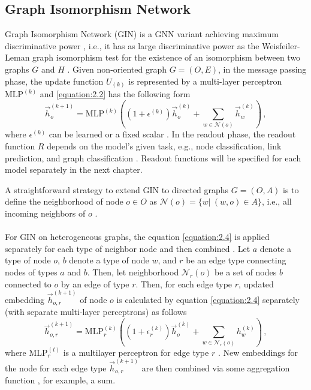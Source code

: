 \subsection{Graph Isomorphism Network} \label{graph Isomorphism network}
Graph Isomorphism Network (GIN) is a GNN variant achieving maximum discriminative power \cite{DBLP:journals/corr/abs-1810-00826}, i.e., it has as large discriminative power as the Weisfeiler-Leman graph isomorphism test for the existence of an isomorphism between two graphs $G$ and $H$ \cite{leman1968reduction}. Given non-oriented graph $G = (O, E)$, in the message passing phase, the update function $U_{(k)}$ is represented by a multi-layer perceptron $\text{MLP}^{(k)}$ and \ref{equation:2.2} has the following form \cite{DBLP:journals/corr/abs-1810-00826}
\begin{equation} \label{equation:2.4}
	\vec{h}_o^{(k+1)} = \text{MLP}^{(k)} \left ( \left ( 1 + \epsilon^{(k)} \right ) \vec{h}_o^{(k)} + \sum_{w\in \mathcal{N}(o)} \vec{h}_w^{(k)} \right ) \, ,
\end{equation}
where $\epsilon^{(k)}$ can be learned or a fixed scalar \cite{DBLP:journals/corr/abs-1810-00826}. In the readout phase, the readout function $R$ depends on the model's given task, e.g., node classification, link prediction, and graph classification \cite{DBLP:journals/corr/abs-1810-00826}. Readout functions will be specified for each model separately in the next chapter.
\par
A straightforward strategy to extend GIN to directed graphs $G = (O, A)$ is to define the neighborhood of node $o \in O$ as $\mathcal{N}(o) = \{ w | \ (w, o) \in A\}$, i.e., all incoming neighbors of $o$ \cite{zhang2020learning}.\\
\\
For GIN on heterogeneous graphs, the equation \ref{equation:2.4} is applied separately for each type of neighbor node and then combined \cite{10226873, pytorch_hetero_conv}. Let $a$ denote a type of node $o$, $b$ denote a type of node $w$, and $r$ be an edge type connecting nodes of types $a$ and $b$. Then, let neighborhood $\mathcal{N}_{r}(o)$ be a set of nodes $b$ connected to $o$ by an edge of type $r$. Then, for each edge type $r$, updated embedding $\vec{h}_{o, r}^{(k+1)}$ of node $o$ is calculated by equation \ref{equation:2.4} separately (with separate multi-layer perceptrons) as follows \cite{pytorch_hetero_conv}
\begin{equation} \label{equation:2.5}
	\vec{h}_{o, r}^{(k+1)} = \text{MLP}^{(k)}_{r} \left ( \left ( 1 + \epsilon_{r}^{(k)} \right ) \vec{h}_{o}^{(k)} + \sum_{w\in \mathcal{N}_{r}(o)} h_{w}^{(k)} \right ) \, ,
\end{equation}
where $\text{MLP}^{(t)}_{r}$ is a multilayer perceptron for edge type $r$ \cite{pytorch_hetero_conv}. New embeddings for the node for each edge type $\vec{h}_{o, r}^{(k+1)}$ are then combined via some aggregation function \cite{pytorch_hetero_conv}, for example, a sum.

